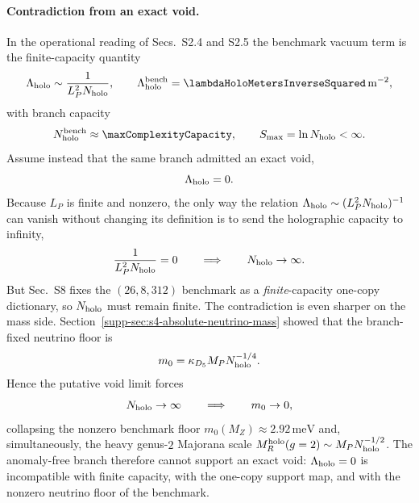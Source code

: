 \documentclass[11pt]{article}
\begin{document}
\paragraph{Contradiction from an exact void.}
In the operational reading of Secs.~S2.4 and S2.5 the benchmark vacuum term is
the finite-capacity quantity
\begin{equation}
 \Lambda_{\rm holo}
 \sim
 \frac{1}{L_P^2N_{\rm holo}},
 \qquad
 \Lambda_{\rm holo}^{\rm bench}
 =
 \lambdaHoloMetersInverseSquared\,\mathrm{m}^{-2},
\end{equation}
with branch capacity
\begin{equation}
 N_{\rm holo}^{\rm bench}\approx\maxComplexityCapacity,
 \qquad
 S_{\max}=\ln N_{\rm holo}<\infty.
\end{equation}
Assume instead that the same branch admitted an exact void,
\begin{equation}
 \Lambda_{\rm holo}=0.
\end{equation}
Because $L_P$ is finite and nonzero, the only way the relation
$\Lambda_{\rm holo}\sim(L_P^2N_{\rm holo})^{-1}$ can vanish without changing its
definition is to send the holographic capacity to infinity,
\begin{equation}
 \frac{1}{L_P^2N_{\rm holo}}=0
 \qquad\Longrightarrow\qquad
 N_{\rm holo}\to\infty.
\end{equation}
But Sec.~S8 fixes the $(26,8,312)$ benchmark as a \emph{finite}-capacity
one-copy dictionary, so $N_{\rm holo}$ must remain finite. The contradiction is
even sharper on the mass side. Section~\ref{supp-sec:s4-absolute-neutrino-mass}
showed that the branch-fixed neutrino floor is
\begin{equation}
 m_0
 =
 \kappa_{D_5}M_PN_{\rm holo}^{-1/4}.
\end{equation}
Hence the putative void limit forces
\begin{equation}
 N_{\rm holo}\to\infty
 \qquad\Longrightarrow\qquad
 m_0\to0,
\end{equation}
collapsing the nonzero benchmark floor $m_0(M_Z)\approx2.92\,\mathrm{meV}$ and,
simultaneously, the heavy genus-$2$ Majorana scale
$M_R^{\rm holo}(g=2)\sim M_PN_{\rm holo}^{-1/2}$. The anomaly-free branch
therefore cannot support an exact void: $\Lambda_{\rm holo}=0$ is incompatible
with finite capacity, with the one-copy support map, and with the nonzero
neutrino floor of the benchmark.
\end{document}

